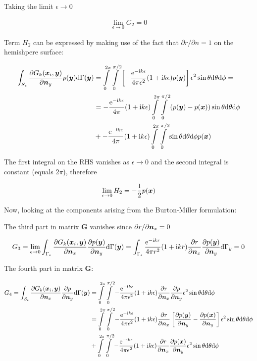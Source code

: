 \documentclass[a4paper, 10pt]{article}
\newcommand{\te}{\mathrm{e}}
\newcommand{\ti}{\mathrm{i}}
\newcommand{\td}{\mathrm{d}}
\newcommand{\sx}{\bm{\mathnormal{x}}}
\newcommand{\sy}{\bm{\mathnormal{y}}}
\newcommand{\sn}{\bm{\mathnormal{n}}}
\newcommand{\bG}{\mathbf{G}}
\newcommand{\limeps}{\lim\limits_{\epsilon \rightarrow 0}}
\newcommand{\intsph}{\int\limits_{0}^{2\pi} \int\limits_{0}^{\pi/2}}
\newcommand{\dsph}{\mathrm{d}\theta \mathrm{d}\phi}
\begin{document}
Taking the limit $\epsilon \rightarrow 0$

\begin{align}
	\limeps G_2 = 0
\end{align}

Term $H_2$ can be expressed by making use of the fact that $\partial r / \partial n = 1$ on the hemishpere surface:

\begin{align}
	\int_{S_\epsilon}\frac{\partial{G}_k (\sx_i, \sy)}{\partial \sn_y} p(\sy) \td \Gamma(\sy) & = 
	\intsph  \left[-\frac{\te^{-\ti k \epsilon}}{4 \pi \epsilon^2}(1 + \ti k \epsilon) p(\sy) \right] \epsilon^2 \sin \theta \mathrm{d} \theta \mathrm{d} \phi = \nonumber \\
	& = -\frac{\te ^{- \ti k\epsilon}}{4\pi}(1 + \ti k\epsilon) \intsph \left(p(\sy) - p(\sx)\right) \sin \theta \dsph \nonumber \\
	& + -\frac{\te ^{ -\ti k\epsilon}}{4\pi}(1 + \ti k\epsilon) \intsph \sin \theta \dsph p(\sx)
\end{align}

The first integral on the RHS vanishes as $\epsilon \rightarrow 0$ and the second integral is constant (equals $2\pi$), therefore

\begin{equation}
	\limeps H_2 = -\frac{1}{2}p(\sx)
\end{equation}

Now, looking at the components arising from the Burton-Miller formulation:

The third part in matrix $\bG$ vanishes since $\partial r / \partial \sn_x = 0$ 

\begin{align}
	G_3 = \limeps \int_{\Gamma_\epsilon} \frac{\partial{G}_k (\sx_i, \sy)}{\partial \sn_x} \frac{\partial p(\sy)}{\partial \sn_y}\td \Gamma(\sy) = 
	\int_{\Gamma_\epsilon} \frac{\te ^{-\ti kr}}{4 \pi r^2}(1 + \ti kr) \frac{\partial r}{\partial \sn_x} \frac{\partial p(\sy)}{\partial \sn_y} \mathrm{d} \Gamma_y = 0
\end{align}

The fourth part in matrix $\bG$:

\begin{align}
	G_4 = \int_{S_\epsilon} \frac{\partial{G}_k (\sx_i, \sy)}{\partial \sn_x} \frac{\partial p}{\partial \sn_y}\td \Gamma(\sy) & = 
	\intsph - \frac{\te ^{-\ti k\epsilon}}{4 \pi \epsilon^2} (1 + \ti k \epsilon) \frac{\partial r}{\partial \sn_x} \frac{\partial p}{\partial \sn_y} \epsilon^2 \sin \theta \dsph \nonumber \\
	& = \intsph- \frac{\te ^{-\ti k\epsilon}}{4 \pi \epsilon^2} (1 + \ti k \epsilon) \frac{\partial r}{\partial \sn_x}\left[ \frac{\partial p(\sy)}{\partial \sn_y} - \frac{\partial p(\sx)}{\partial \sn_y}\right] \epsilon^2 \sin \theta \dsph \nonumber \\
	& + \intsph - \frac{\te ^{-\ti k\epsilon}}{4 \pi \epsilon^2} (1 + \ti k \epsilon) \frac{\partial r}{\partial \sn_x} \frac{\partial p(\sx)}{\partial \sn_y}  \epsilon^2 \sin \theta \dsph 
\end{align}
\end{document}

